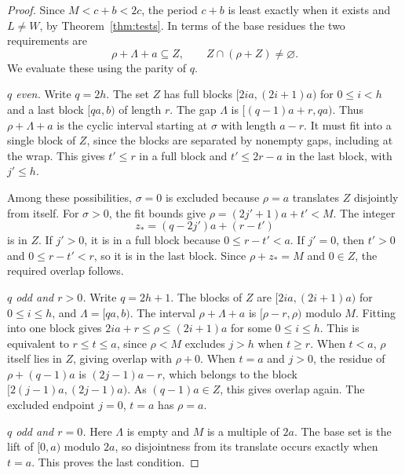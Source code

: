 \documentclass[11pt]{article}
\begin{document}
\begin{proof}
Since $M<c+b<2c$, the period $c+b$ is least exactly when it
exists and $L\ne W$, by Theorem~\ref{thm:tests}.
In terms of the base residues the two requirements are
\[
 \rho+\Lambda+a\subseteq Z,\qquad Z\cap(\rho+Z)\ne\varnothing .
\]
We evaluate these using the parity of $q$.

\smallskip
\noindent\textit{$q$ even.}
Write $q=2h$. The set $Z$ has full blocks
$[2ia,(2i+1)a)$ for $0\le i<h$ and a last block $[qa,b)$
of length $r$. The gap $\Lambda$ is $[(q-1)a+r,qa)$.
Thus $\rho+\Lambda+a$ is the cyclic interval starting at
$\sigma$ with length $a-r$. It must fit into a single block
of $Z$, since the blocks are separated by nonempty gaps,
including at the wrap. This gives $t'\le r$ in a full block
and $t'\le 2r-a$ in the last block, with $j'\le h$.

Among these possibilities, $\sigma=0$ is excluded because
$\rho=a$ translates $Z$ disjointly from itself. For
$\sigma>0$, the fit bounds give
$\rho=(2j'+1)a+t'<M$. The integer
\[
 z_*=(q-2j')a+(r-t')
\]
is in $Z$. If $j'>0$, it is in a full block because
$0\le r-t'<a$. If $j'=0$, then $t'>0$ and
$0\le r-t'<r$, so it is in the last block. Since
$\rho+z_*=M$ and $0\in Z$, the required overlap follows.

\smallskip
\noindent\textit{$q$ odd and $r>0$.}
Write $q=2h+1$. The blocks of $Z$ are $[2ia,(2i+1)a)$ for
$0\le i\le h$, and $\Lambda=[qa,b)$.
The interval $\rho+\Lambda+a$ is $[\rho-r,\rho)$ modulo $M$.
Fitting into one block gives $2ia+r\le\rho\le(2i+1)a$
for some $0\le i\le h$. This is equivalent to $r\le t\le a$,
since $\rho<M$ excludes $j>h$ when $t\ge r$.
When $t<a$, $\rho$ itself lies in $Z$, giving overlap with
$\rho+0$. When $t=a$ and $j>0$, the residue of
$\rho+(q-1)a$ is $(2j-1)a-r$, which belongs to the
block $[2(j-1)a,(2j-1)a)$. As $(q-1)a\in Z$, this
gives overlap again. The excluded endpoint $j=0$, $t=a$
has $\rho=a$.

\smallskip
\noindent\textit{$q$ odd and $r=0$.}
Here $\Lambda$ is empty and $M$ is a multiple of $2a$.
The base set is the lift of $[0,a)$ modulo $2a$, so disjointness
from its translate occurs exactly when $t=a$. This proves the
last condition.
\end{proof}
\end{document}
